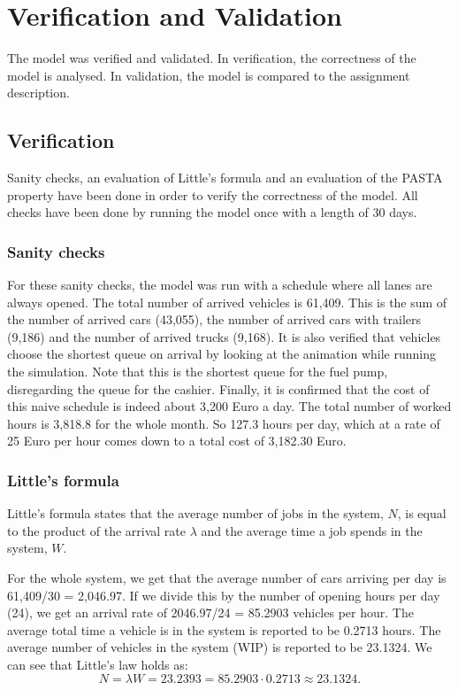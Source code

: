 \section{Verification and Validation}

The model was verified and validated.
In verification, the correctness of the model is analysed. 
In validation, the model is compared to the assignment description.

\subsection{Verification}
Sanity checks, an evaluation of Little's formula and an evaluation of the PASTA property have been done in order to verify the correctness of the model. 
All checks have been done by running the model once with a length of 30 days. 

\subsubsection{Sanity checks}

For these sanity checks, the model was run with a schedule where all lanes are always opened.
The total number of arrived vehicles is 61,409.
This is the sum of the number of arrived cars (43,055), the number of arrived cars with trailers (9,186) and the number of arrived trucks (9,168).
It is also verified that vehicles choose the shortest queue on arrival by looking at the animation while running the simulation.
Note that this is the shortest queue for the fuel pump, disregarding the queue for the cashier.
Finally, it is confirmed that the cost of this naive schedule is indeed about 3,200 Euro a day. 
The total number of worked hours is 3,818.8 for the whole month. 
So 127.3 hours per day, which at a rate of 25 Euro per hour comes down to a total cost of 3,182.30 Euro.

\subsubsection{Little's formula}
Little's formula states that the average number of jobs in the system, $N$, is equal to the product of the arrival rate $\lambda$ and the average time a job spends in the system, $W$.

For the whole system, we get that the average number of cars arriving per day is 61,409/30 = 2,046.97. 
If we divide this by the number of opening hours per day (24), we get an arrival rate of 2046.97/24 = 85.2903 vehicles per hour.
The average total time a vehicle is in the system is reported to be 0.2713 hours.
The average number of vehicles in the system (WIP) is reported to be 23.1324.
We can see that Little's law holds as:
$$N=\lambda W = 23.2393 = 85.2903\cdot0.2713 \approx 23.1324.$$

